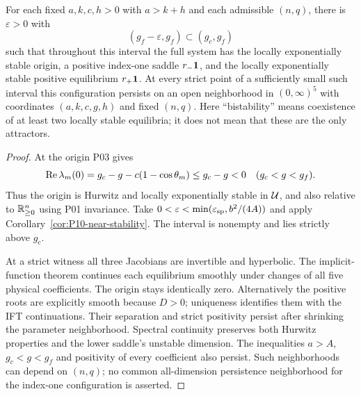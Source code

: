 \begin{theorem}
\label{thm:P10-bistability}
For each fixed $a,k,c,h>0$ with $a>k+h$ and each admissible $(n,q)$,
there is $\varepsilon>0$ with
\begin{equation}
 (g_f-\varepsilon,g_f)\subset(g_c,g_f)
 \label{eq:P10-bistable-interval}
\end{equation}
such that throughout this interval the full system has the locally
exponentially stable origin, a positive index-one saddle $r_-\mathbf{1}$,
and the locally exponentially stable positive equilibrium $r_+\mathbf{1}$.
At every strict point of a sufficiently small such interval this
configuration persists on an open neighborhood in $(0,\infty)^5$
with coordinates $(a,k,c,g,h)$ and fixed $(n,q)$.
Here ``bistability'' means coexistence of at least two locally stable
equilibria; it does not mean that these are the only attractors.
\end{theorem}
\begin{proof}
At the origin P03 gives
\[
 \operatorname{Re}\lambda_m(0)=g_c-g-c(1-\cos\theta_m)\le g_c-g<0
 \quad(g_c<g<g_f).
\]
Thus the origin is Hurwitz and locally exponentially stable in
$\mathcal{U}$, and also relative to $\mathbb{R}_{\geq 0}^{n}$ using P01 invariance.
Take $0<\varepsilon<\min(\varepsilon_{\rm sp},b^2/(4A))$ and
apply Corollary~\ref{cor:P10-near-stability}. The interval is nonempty
and lies strictly above $g_c$.

At a strict witness all three Jacobians are invertible and hyperbolic.
The implicit-function theorem continues each equilibrium smoothly
under changes of all five physical coefficients. The origin stays
identically zero. Alternatively the positive roots are explicitly
smooth because $D>0$; uniqueness identifies them with the IFT
continuations. Their separation and strict positivity persist after
shrinking the parameter neighborhood. Spectral continuity preserves
both Hurwitz properties and the lower saddle's unstable dimension.
The inequalities $a>A$, $g_c<g<g_f$ and positivity of every coefficient
also persist. Such neighborhoods can depend on $(n,q)$; no common
all-dimension persistence neighborhood for the index-one configuration
is asserted.
\end{proof}

